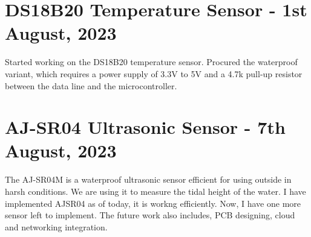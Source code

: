 \documentclass{article}
\begin{document}
\section*{DS18B20 Temperature Sensor - 1st August, 2023}
Started working on the DS18B20 temperature sensor. Procured the waterproof variant, which requires a power supply of 3.3V to 5V and a 4.7k pull-up resistor between the data line and the microcontroller.

\section*{AJ-SR04 Ultrasonic Sensor - 7th August, 2023}
The AJ-SR04M is a waterproof ultrasonic sensor efficient for using outside in harsh conditions. We are using it to measure the tidal height of the water. I have implemented AJSR04 as of today, it is workng efficiently. Now, I have one more sensor left to implement. The future work also includes, PCB designing, cloud and networking integration. 
\end{document}
